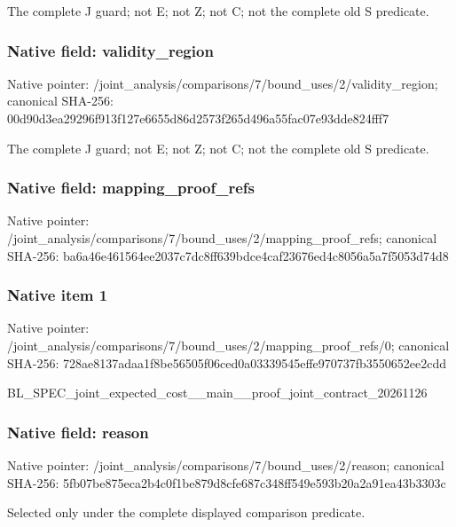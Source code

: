 \documentclass[10pt,a4paper]{article}
\begin{document}
The complete J guard; not E; not Z; not C; not the complete old S predicate.


\subsubsection{Native field: validity\_region}


Native pointer: /joint\_analysis/comparis\allowbreak{}ons/7/bound\_uses/2/valid\allowbreak{}ity\_region; canonical SHA-256: 00d90d3ea29296f913f127e6\allowbreak{}655d86d2573f265d496a55fa\allowbreak{}c07e93dde824fff7


The complete J guard; not E; not Z; not C; not the complete old S predicate.


\subsubsection{Native field: mapping\_proof\_refs}


Native pointer: /joint\_analysis/comparis\allowbreak{}ons/7/bound\_uses/2/mappi\allowbreak{}ng\_proof\_refs; canonical SHA-256: ba6a46e461564ee2037c7dc8\allowbreak{}ff639bdce4caf23676ed4c80\allowbreak{}56a5a7f5053d74d8



\subsubsection{Native item 1}


Native pointer: /joint\_analysis/comparis\allowbreak{}ons/7/bound\_uses/2/mappi\allowbreak{}ng\_proof\_refs/0; canonical SHA-256: 728ae8137adaa1f8be56505f\allowbreak{}06ced0a03339545effe97073\allowbreak{}7fb3550652ee2cdd


BL\_SPEC\_joint\_expected\_c\allowbreak{}ost\_\_main\_\_proof\_joint\_c\allowbreak{}ontract\_20261126


\subsubsection{Native field: reason}


Native pointer: /joint\_analysis/comparis\allowbreak{}ons/7/bound\_uses/2/reaso\allowbreak{}n; canonical SHA-256: 5fb07be875eca2b4c0f1be87\allowbreak{}9d8cfe687c348ff549e593b2\allowbreak{}0a2a91ea43b3303c


Selected only under the complete displayed comparison predicate.
\end{document}
